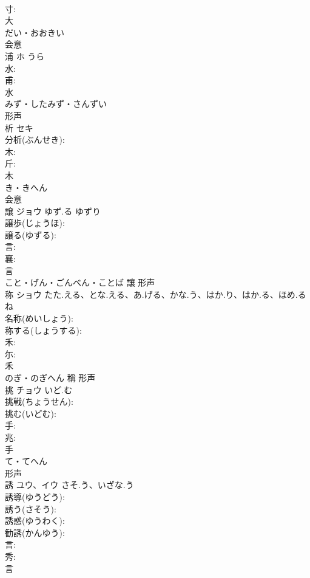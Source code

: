 \documentclass[8pt]{extreport}
\begin{document}
\begin{CJK}{UTF8}{min}
\\	寸: 
\\	大	
\\	だい・おおきい	
\\	会意 
\\	浦	ホ	うら		
\\	水: 
\\	甫: 
\\	水	
\\	みず・したみず・さんずい	
\\	形声 
\\	析	セキ			
\\	分析(ぶんせき): 
\\	木: 
\\	斤: 
\\	木	
\\	き・きへん	
\\	会意 
\\	譲	ジョウ	ゆず.る	ゆずり	
\\	譲歩(じょうほ): 
\\	譲る(ゆずる): 
\\	言: 
\\	襄: 
\\	言	
\\	こと・げん・ごんべん・ことば	讓	形声 
\\	称	ショウ	たた.える、とな.える、あ.げる、かな.う、はか.り、はか.る、ほめ.る	ね	
\\	名称(めいしょう): 
\\	称する(しょうする): 
\\	禾: 
\\	尓: 
\\	禾	
\\	のぎ・のぎへん	稱	形声 
\\	挑	チョウ	いど.む		
\\	挑戦(ちょうせん): 
\\	挑む(いどむ): 
\\	手: 
\\	兆: 
\\	手	
\\	て・てへん	
\\	形声 
\\	誘	ユウ、イウ	さそ.う、いざな.う		
\\	誘導(ゆうどう): 
\\	誘う(さそう): 
\\	誘惑(ゆうわく): 
\\	勧誘(かんゆう): 
\\	言: 
\\	秀: 
\\	言	

\end{CJK}
\end{document}

